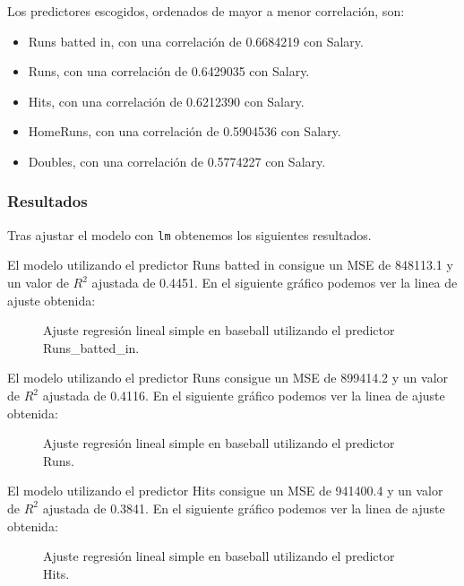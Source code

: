Los predictores escogidos, ordenados de mayor a menor correlación, son:

\begin{itemize}
	\item Runs batted in, con una correlación de 0.6684219 con Salary.
	\item Runs, con una correlación de 0.6429035 con Salary.
	\item Hits, con una correlación de 0.6212390 con Salary.
	\item HomeRuns, con una correlación de 0.5904536 con Salary.
	\item Doubles, con una correlación de 0.5774227 con Salary.
\end{itemize}

\subsubsection{Resultados}

Tras ajustar el modelo con \texttt{lm} obtenemos los siguientes resultados.

El modelo utilizando el predictor Runs batted in consigue un MSE de 848113.1 y un valor de $R^2$ ajustada de 0.4451. En el siguiente gráfico podemos ver la linea de ajuste obtenida:

\begin{figure}[H]
	\centering
	
	\caption{Ajuste regresión lineal simple en baseball utilizando el predictor Runs\_batted\_in.}
	\label{fig:ajuste_Runs_batted_in}
\end{figure}

El modelo utilizando el predictor Runs consigue un MSE de 899414.2 y un valor de $R^2$ ajustada de 0.4116. En el siguiente gráfico podemos ver la linea de ajuste obtenida:

\begin{figure}[H]
	\centering
	
	\caption{Ajuste regresión lineal simple en baseball utilizando el predictor Runs.}
	\label{fig:ajuste_Runs}
\end{figure}

El modelo utilizando el predictor Hits consigue un MSE de 941400.4 y un valor de $R^2$ ajustada de 0.3841. En el siguiente gráfico podemos ver la linea de ajuste obtenida:

\begin{figure}[H]
	\centering
	
	\caption{Ajuste regresión lineal simple en baseball utilizando el predictor Hits.}
	\label{fig:ajuste_Hits}
\end{figure}

